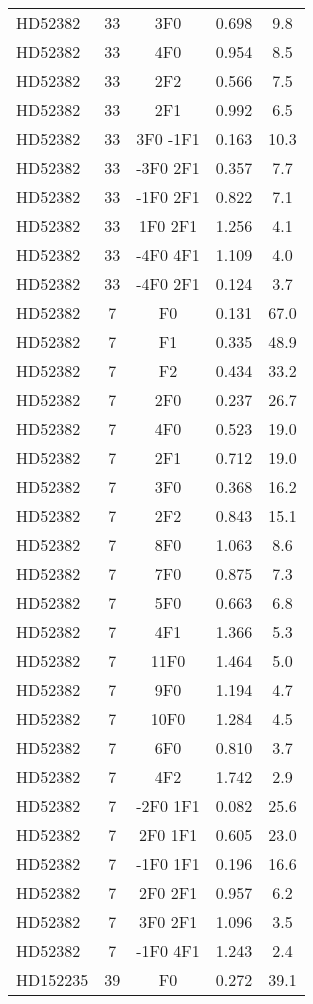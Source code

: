 \begin{table*}
\begin{tabular}{l c c c c}
HD52382 & 33 & 3F0 & 0.698 & 9.8\\ 
HD52382 & 33 & 4F0 & 0.954 & 8.5\\ 
HD52382 & 33 & 2F2 & 0.566 & 7.5\\ 
HD52382 & 33 & 2F1 & 0.992 & 6.5\\ 
HD52382 & 33 & 3F0 -1F1 & 0.163 & 10.3\\ 
HD52382 & 33 & -3F0 2F1 & 0.357 & 7.7\\ 
HD52382 & 33 & -1F0 2F1 & 0.822 & 7.1\\ 
HD52382 & 33 & 1F0 2F1 & 1.256 & 4.1\\ 
HD52382 & 33 & -4F0 4F1 & 1.109 & 4.0\\ 
HD52382 & 33 & -4F0 2F1 & 0.124 & 3.7\\ 
\hline
HD52382 & 7 & F0 & 0.131 & 67.0\\ 
HD52382 & 7 & F1 & 0.335 & 48.9\\ 
HD52382 & 7 & F2 & 0.434 & 33.2\\ 
HD52382 & 7 & 2F0 & 0.237 & 26.7\\ 
HD52382 & 7 & 4F0 & 0.523 & 19.0\\ 
HD52382 & 7 & 2F1 & 0.712 & 19.0\\ 
HD52382 & 7 & 3F0 & 0.368 & 16.2\\ 
HD52382 & 7 & 2F2 & 0.843 & 15.1\\ 
HD52382 & 7 & 8F0 & 1.063 & 8.6\\ 
HD52382 & 7 & 7F0 & 0.875 & 7.3\\ 
HD52382 & 7 & 5F0 & 0.663 & 6.8\\ 
HD52382 & 7 & 4F1 & 1.366 & 5.3\\ 
HD52382 & 7 & 11F0 & 1.464 & 5.0\\ 
HD52382 & 7 & 9F0 & 1.194 & 4.7\\ 
HD52382 & 7 & 10F0 & 1.284 & 4.5\\ 
HD52382 & 7 & 6F0 & 0.810 & 3.7\\ 
HD52382 & 7 & 4F2 & 1.742 & 2.9\\ 
HD52382 & 7 & -2F0 1F1 & 0.082 & 25.6\\ 
HD52382 & 7 & 2F0 1F1 & 0.605 & 23.0\\ 
HD52382 & 7 & -1F0 1F1 & 0.196 & 16.6\\ 
HD52382 & 7 & 2F0 2F1 & 0.957 & 6.2\\ 
HD52382 & 7 & 3F0 2F1 & 1.096 & 3.5\\ 
HD52382 & 7 & -1F0 4F1 & 1.243 & 2.4\\ 
\hline
HD152235 & 39 & F0 & 0.272 & 39.1\\ 

\end{tabular}
\end{table*}
